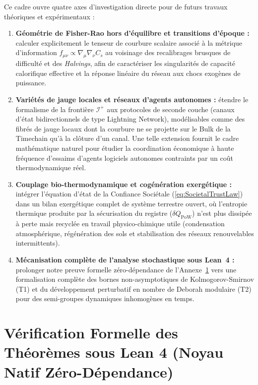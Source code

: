 \documentclass[10pt,twocolumn,a4paper]{article}
\theoremstyle{plain}
\theoremstyle{definition}
\theoremstyle{remark}
\newcommand{\scri}{\mathcal{I}}
\begin{document}
Ce cadre ouvre quatre axes d'investigation directe pour de futurs travaux théoriques et expérimentaux :
\begin{enumerate}
    \item \textbf{Géométrie de Fisher-Rao hors d'équilibre et transitions d'époque :} calculer explicitement le tenseur de courbure scalaire associé à la métrique d'information $f_{\mu\nu} \propto \nabla_\mu \nabla_\nu C_s$ au voisinage des recalibrages brusques de difficulté et des \textit{Halvings}, afin de caractériser les singularités de capacité calorifique effective et la réponse linéaire du réseau aux chocs exogènes de puissance.
    \item \textbf{Variétés de jauge locales et réseaux d'agents autonomes :} étendre le formalisme de la frontière $\scri^+$ aux protocoles de seconde couche (canaux d'état bidirectionnels de type Lightning Network), modélisables comme des fibrés de jauge locaux dont la courbure ne se projette sur le Bulk de la Timechain qu'à la clôture d'un canal. Une telle extension fournit le cadre mathématique naturel pour étudier la coordination économique à haute fréquence d'essaims d'agents logiciels autonomes contraints par un coût thermodynamique réel.
    \item \textbf{Couplage bio-thermodynamique et cogénération exergétique :} intégrer l'équation d'état de la Confiance Sociétale (\ref{eq:SocietalTrustLaw}) dans un bilan exergétique complet de système terrestre ouvert, où l'entropie thermique produite par la sécurisation du registre ($\delta Q_{\text{PoW}}$) n'est plus dissipée à perte mais recyclée en travail physico-chimique utile (condensation atmosphérique, régénération des sols et stabilisation des réseaux renouvelables intermittents).
    \item \textbf{Mécanisation complète de l'analyse stochastique sous Lean~4 :} prolonger notre preuve formelle zéro-dépendance de l'Annexe~\ref{app:lean4} vers une formalisation complète des bornes non-asymptotiques de Kolmogorov-Smirnov (T1) et du développement perturbatif en nombre de Deborah modulaire (T2) pour des semi-groupes dynamiques inhomogènes en temps.
\end{enumerate}
\onecolumn
\appendix

\section{Vérification Formelle des Théorèmes sous Lean 4 (Noyau Natif Zéro-Dépendance)}
\label{app:lean4}
\end{document}
